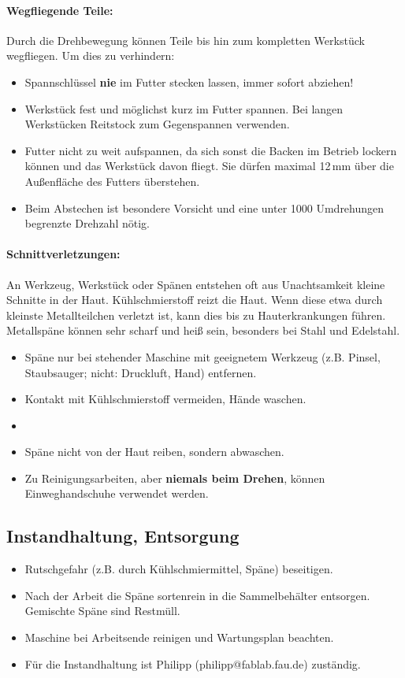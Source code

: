 \documentclass{\basedir/fablab-document}
\begin{document}
\paragraph{Wegfliegende Teile:} Durch die Drehbewegung können Teile bis hin zum kompletten Werkstück wegfliegen. Um dies zu verhindern:
\begin{itemize}
 \item Spannschlüssel \textbf{nie} im Futter stecken lassen, immer sofort abziehen!
\item Werkstück fest und möglichst kurz im Futter spannen. Bei langen Werkstücken Reitstock zum Gegenspannen verwenden.
\item Futter nicht zu weit aufspannen, da sich sonst die Backen im Betrieb lockern können und das Werkstück davon fliegt. Sie dürfen maximal 12\,mm über die Außenfläche des Futters überstehen.
\item Beim Abstechen ist besondere Vorsicht und eine unter 1000 Umdrehungen begrenzte Drehzahl nötig.
\end{itemize}

\paragraph{Schnittverletzungen:} An Werkzeug, Werkstück oder Spänen entstehen oft aus Unachtsamkeit kleine Schnitte in der Haut. Kühlschmierstoff reizt die Haut. Wenn diese etwa durch kleinste Metallteilchen verletzt ist, kann dies bis zu Hauterkrankungen führen. Metallspäne können sehr scharf und heiß sein, besonders bei Stahl und Edelstahl.
\begin{itemize}
\item Späne nur bei stehender Maschine mit geeignetem Werkzeug (z.B. Pinsel, Staubsauger; nicht: Druckluft, Hand) entfernen. %
	\item Kontakt mit Kühlschmierstoff vermeiden, Hände waschen.
	\item {}
	\item Späne nicht von der Haut reiben, sondern abwaschen.
	\item Zu Reinigungsarbeiten, aber \textbf{niemals beim Drehen}, können Einweghandschuhe verwendet werden.
\end{itemize}

\subsection{Instandhaltung, Entsorgung}
\begin{itemize}
\item Rutschgefahr (z.B. durch Kühlschmiermittel, Späne) beseitigen.
\item Nach der Arbeit die Späne sortenrein in die Sammelbehälter entsorgen. Gemischte Späne sind Restmüll.
\item Maschine bei Arbeitsende reinigen und Wartungsplan beachten.
\item Für die Instandhaltung ist Philipp (philipp@fablab.fau.de) zuständig.
\end{itemize}
\end{document}
